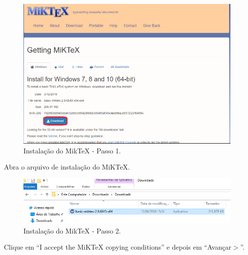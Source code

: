 \begin{figure}[htb]
  \begin{center}
    \includegraphics[scale=0.4]{imagens/miktex/miktex1.png}
  \end{center}
  \caption{Instalação do MikTeX - Passo 1.}
  \label{mt1}
\end{figure}

Abra o arquivo de instalação do MiKTeX.\\

\begin{figure}[htb]
  \begin{center}
    \includegraphics[scale=0.6]{imagens/miktex/miktex2.png}
  \end{center}
  \caption{Instalação do MikTeX - Passo 2.}
  \label{mt2}
\end{figure}

\newpage
Clique em “I accept the MiKTeX copying conditions” e depois em “Avançar$>$”.\\

